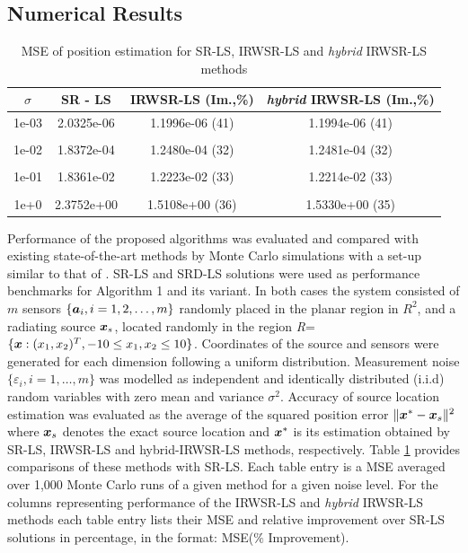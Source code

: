 \subsection{Numerical Results}

\begin{table}
\centering
\caption{MSE of position estimation for SR-LS, IRWSR-LS and \textit{hybrid} IRWSR-LS methods}
\begin{tabular}{|c|c|c|c|} \hline
\centering
$\sigma$ & SR - LS & IRWSR-LS (Im.,\%) & \textit{hybrid} IRWSR-LS (Im.,\%) \\ \hline
1e-03&	2.0325e-06&	1.1996e-06 (41)	& 1.1994e-06 (41)\\ &&&\\
1e-02&	1.8372e-04&	1.2480e-04 (32)	& 1.2481e-04 (32)\\ &&&\\
1e-01&	1.8361e-02&	1.2223e-02 (33)	& 1.2214e-02 (33)\\ &&&\\
1e+0&	2.3752e+00&	1.5108e+00 (36)	& 1.5330e+00 (35)\\ %
\hline
\end{tabular}
\label{tab:1}
\end{table}

Performance of the proposed algorithms was evaluated and compared with existing state-of-the-art methods by Monte Carlo simulations with a set-up similar to that of \cite{BeckStLi}. SR-LS and SRD-LS solutions were used as performance benchmarks for Algorithm 1 and its variant. In both cases the system consisted of $m$ sensors $\{\mbox{\boldmath$a$}_i, i=1, 2,\ldots,m\}$ randomly placed in the planar region in $R^2$, and a radiating source $\mbox{\boldmath$x$}_s$, located randomly in the region \textit{R}=$\{\mbox{\boldmath$x$}:(x_1,x_2)^T, -10\leq x_1,x_2\leq 10\}$. Coordinates of the source and sensors were generated for each dimension following a uniform distribution. Measurement noise $\{\varepsilon_i, i=1,\ldots,m\}$ was modelled as independent and identically distributed (i.i.d) random variables with zero mean and variance $\sigma^2$. Accuracy of source location estimation was evaluated as the average of the squared position error $\|\mbox{\boldmath$x$}^* - \mbox{\boldmath$x$}_s\|^2$ where $\mbox{\boldmath$x$}_s$ denotes the exact source location and $\mbox{\boldmath$x$}^*$ is its estimation obtained by SR-LS, IRWSR-LS and hybrid-IRWSR-LS methods, respectively. Table \ref{tab:1} provides comparisons of these methods with SR-LS. Each table entry is a MSE averaged over 1,000 Monte Carlo runs of a given method for a given noise level. For the columns representing performance of the IRWSR-LS and \textit{hybrid} IRWSR-LS methods each table entry lists their MSE and relative improvement over SR-LS solutions in percentage, in the format: MSE($\%$ Improvement). 

